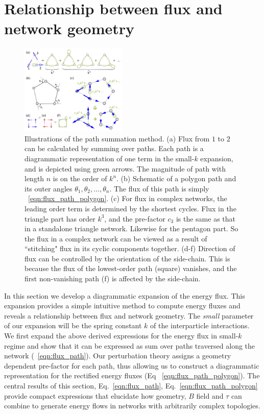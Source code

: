 \documentclass[
 preprint,
 preprintnumbers,
 amsmath,amssymb,
 aps,
 pre,
 longbibliography,
 superscriptaddress,
 10pt, twocolumn
]{revtex4-1}
\begin{document}
\section{Relationship between flux and network geometry} \label{sec:path}
\begin{figure}[ht]
	\centering
	\includegraphics[width=0.45\textwidth]{4_path_sum.pdf}
    \caption{Illustrations of the path summation method.
    (a) Flux from $1$ to $2$ can be calculated by summing over paths. Each path is a diagrammatic representation of one term in the small-$k$ expansion, and is depicted using green arrows. The magnitude of path with length $n$ is on the order of $k^n$.
    (b) Schematic of a polygon path and its outer angles $\theta_1,\theta_2,\dots,\theta_n$. The flux of this path is simply \eqnname~\eqref{eqn:flux_path_polygon}.
    (c) For flux in complex networks, the leading order term is determined by the shortest cycles. Flux in the triangle part has order $k^3$, and the pre-factor $c_3$ is the same as that in a standalone triangle network. Likewise for the pentagon part. So the flux in a complex network can be viewed as a result of ``stitching" flux in its cyclic components together.
    (d-f) Direction of flux can be controlled by the orientation of the side-chain. This is because the flux of the lowest-order path (square) vanishes, and the first non-vanishing path (f) is affected by the side-chain.
    }
    \label{fig:path_sum}
\end{figure}

In this section we develop a diagrammatic expansion of the energy flux. This expansion provides a simple intuitive method to compute energy fluxes and reveals a relationship between flux and network geometry. The {\it{small}} parameter of our expansion will be the spring constant $k$ of the interparticle interactions. We first expand the above derived expressions for the energy flux in small-$k$ regime and show that it can be expressed as sum over paths traversed along the network (\eqnname~\eqref{eqn:flux_path}). Our perturbation theory assigns a geometry dependent pre-factor for each path, thus allowing us to construct a diagrammatic representation for the rectified energy fluxes (Eq \eqnname~\eqref{eqn:flux_path_polygon}). The central results of this section, Eq.~\ref{eqn:flux_path}, Eq.~\ref{eqn:flux_path_polygon} provide compact expressions that elucidate how geometry, $B$ field and $\tau$ can combine to generate energy flows in networks with arbitrarily complex topologies.
\end{document}
